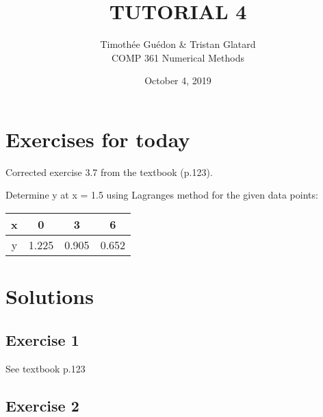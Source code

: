 \documentclass[12pt]{article}
\newenvironment{exercise}[2][Exercise]{\begin{trivlist}
\item[\hskip \labelsep {\bfseries #1}\hskip \labelsep {\bfseries #2.}]}{\end{trivlist}}
\begin{document}
\title{TUTORIAL 4}
\author{Timothée Guédon \& Tristan Glatard\\
COMP 361 Numerical Methods}
\date{October 4, 2019}
\maketitle

\section{Exercises for today}

\begin{exercise}{1}
Corrected exercise 3.7 from the textbook (p.123).
\end{exercise}

\begin{exercise}{2}
  Determine y at x = 1.5 using Lagrange\textquotesingle s method for the given data points: \\
  \begin{table}[h]
  \centering
  \begin{tabular}{|c|c|c|c|}
    \hline
    x & 0 & 3 & 6 \\ \hline
    y & 1.225 & 0.905 & 0.652 \\ \hline
  \end{tabular}
  \end{table}
\end{exercise}

\break

\section{Solutions}

\subsection{Exercise 1}

See textbook p.123

\subsection{Exercise 2}
\end{document}
